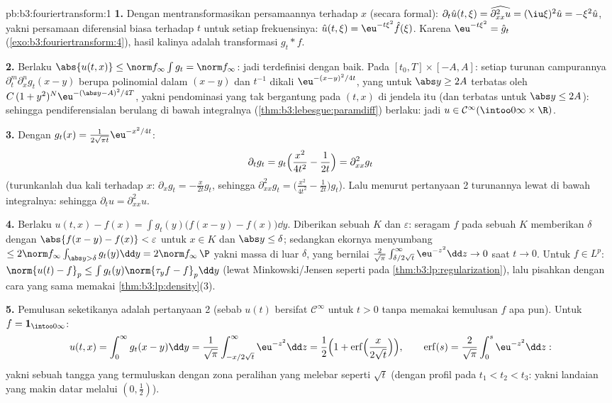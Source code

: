 \begin{solution}{pb:b3:fouriertransform:1}
\textbf{1.} Dengan mentransformasikan persamaannya terhadap $x$ (secara formal):
$\partial_t\hat u(t,\xi) = \widehat{\partial^2_{xx}u} =
(\iu\xi)^2\hat u = -\xi^2\hat u$, yakni persamaan diferensial biasa terhadap $t$ untuk setiap
frekuensinya: $\hat u(t,\xi) = \eu^{-t\xi^2}\hat f(\xi)$. Karena
$\eu^{-t\xi^2} = \hat g_t$
(\cref{exo:b3:fouriertransform:4}), hasil kalinya adalah
transformasi $g_t * f$.

\textbf{2.} Berlaku $\abs{u(t,x)} \leq \norm f_\infty\int g_t = \norm
f_\infty$: jadi terdefinisi dengan baik. Pada $[t_0, T]\times[-A, A]$: setiap
turunan campurannya $\partial^m_t\partial^n_xg_t(x - y)$ berupa
polinomial dalam $(x - y)$ dan $t^{-1}$ dikali
$\eu^{-(x-y)^2/4t}$, yang untuk $\abs y \geq 2A$ terbatas oleh
$C\,(1 + y^2)^N\eu^{-(\abs y - A)^2/4T}$, yakni pendominasi 
yang tak bergantung pada $(t, x)$ di jendela itu (dan terbatas
untuk $\abs y \leq 2A$): sehingga pendiferensialan berulang di bawah
integralnya (\cref{thm:b3:lebesgue:paramdiff}) berlaku: jadi $u \in
\mathcal C^\infty(\intoo0\infty\times\R)$.

\textbf{3.} Dengan $g_t(x) = \frac1{2\sqrt{\pi
t}}\eu^{-x^2/4t}$:
\[
\partial_tg_t = g_t\Bigl(\frac{x^2}{4t^2} - \frac1{2t}\Bigr)
= \partial^2_{xx}g_t
\]
(turunkanlah dua kali terhadap $x$: $\partial_xg_t = -\frac
x{2t}g_t$, sehingga $\partial^2_{xx}g_t = \bigl(\frac{x^2}{4t^2} -
\frac1{2t}\bigr)g_t$). Lalu menurut pertanyaan 2 turunannya lewat
di bawah integralnya: sehingga $\partial_tu = \partial^2_{xx}u$.

\textbf{4.} Berlaku $u(t,x) - f(x) = \int g_t(y)\bigl(f(x - y) -
f(x)\bigr)\dd y$. Diberikan sebuah  $K$ dan $\varepsilon$:
 seragam $f$ pada sebuah  $K$ memberikan
$\delta$ dengan $\abs{f(x-y) - f(x)} < \varepsilon$ untuk $x \in
K$ dan $\abs y \leq \delta$; sedangkan ekornya menyumbang $\leq 2\norm
f_\infty\int_{\abs y > \delta}g_t(y)\dd y = 2\norm
f_\infty\,\P$ yakni massa di luar $\delta$, yang bernilai
$\frac2{\sqrt\pi}\int_{\delta/2\sqrt t}^\infty\eu^{-z^2}\dd z
\to 0$ saat $t \to 0$. Untuk $f \in L^p$: $\norm{u(t) - f}_p \leq
\int g_t(y)\norm{\tau_yf - f}_p\dd y$ (lewat Minkowski/Jensen seperti pada
\cref{thm:b3:lp:regularization}), lalu pisahkan dengan cara yang sama memakai
\cref{thm:b3:lp:density}(3).

\textbf{5.} Pemulusan seketikanya adalah pertanyaan 2 (sebab $u(t)$ bersifat
$\mathcal C^\infty$ untuk $t > 0$ tanpa memakai kemulusan $f$
apa pun). Untuk $f = \mathbf 1_{\intoo0\infty}$:
\[
u(t, x) = \int_0^\infty g_t(x - y)\dd y
= \frac1{\sqrt\pi}\int_{-x/2\sqrt t}^{\infty}\eu^{-z^2}\dd z
= \frac12\Bigl(1 +
\operatorname{erf}\Bigl(\frac{x}{2\sqrt t}\Bigr)\Bigr),
\qquad \operatorname{erf}(s) =
\frac2{\sqrt\pi}\int_0^s\eu^{-z^2}\dd z :
\]
yakni sebuah tangga yang termuluskan dengan zona peralihan yang melebar seperti $\sqrt t$
(dengan profil pada $t_1 < t_2 < t_3$: yakni landaian yang makin datar melalui
$(0, \frac12)$).


\end{solution}

